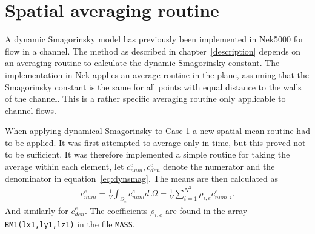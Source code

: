 \section{Spatial averaging routine}
A dynamic Smagorinsky model has previously been implemented in Nek5000 for flow in a channel. 
The method as described in chapter~\ref{description} depends on an averaging routine to calculate
the dynamic Smagorinsky constant. The implementation in Nek applies an average routine in the plane,
assuming that the Smagorinsky constant is the same for all points with equal distance to the walls 
of the channel. This is a rather specific averaging routine only applicable to channel flows.

When applying dynamical Smagorinsky to Case 1 a new spatial mean routine had to be applied. 
It was first attempted to average only in time, but this proved not to be sufficient. It was
therefore implemented a simple routine for taking the average within each element, let 
$c_{num}^e,c_{den}^e$ denote the numerator and the denominator in equation~\ref{eq:dynsmag}.
The means are then calculated as 
\begin{align}
    c_{num}^e = \frac{1}{V}\int_{\Omega_e}c_{num}^e d\: \Omega 
    = \frac{1}{V}\sum_{i = 1}^{N^3}\rho_{i,e}c_{num,i}^{e}.
    \label{eq:averageroutine}
\end{align}
And similarly for $c_{den}^e$.
The coefficients $\rho_{i,e}$ are found in the array \verb|BM1(lx1,ly1,lz1)| in the file 
\verb|MASS|.
